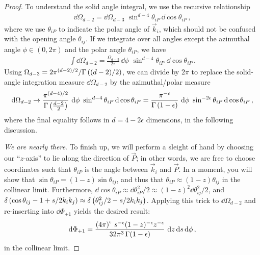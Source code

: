\begin{proof}
    To understand the solid angle integral, we use the recursive relationship
    \begin{align}
        \dd \Omega_{d-2}
        =
        \dd \Omega_{d-3}
        \,\,
        \sin^{d-4}\theta_{iP} \, \dd \cos \theta_{iP}
        \,,
    \end{align}
    where we use \(\theta_{iP}\) to indicate the polar angle of \(\vec{k}_i\), which should not be confused with the opening angle \(\theta_{ij}\).
    If we integrate over all angles except the azimuthal angle \(\phi \in (0, 2\pi)\) and the polar angle \(\theta_{iP}\), we have
    \begin{align}
        \int
        \dd \Omega_{d-2}
        =
        \frac{\Omega_{d-3}}{2\pi}
        \,
        \dd \phi
        \,\,
        \sin^{d-4}\theta_{iP}
        \,\,
        \dd\cos\theta_{iP}
        \,.
    \end{align}
    Using \(\Omega_{d-3} = 2 \pi^{(d-2)/2} / \Gamma\left((d-2)/2\right)\), we can divide by \(2 \pi\) to replace the solid-angle integration measure \(\dd \Omega_{d-2}\) by the azimuthal/polar measure
    \begin{align}
        \dd \Omega_{d-2}
        \to
        \frac{\pi^{(d-4)/2}}{\Gamma\left(\frac{d-2}{2}\right)}
        \,\,
        \dd\phi
        \,\,
        \sin^{d-4}\theta_{iP}
        \,
        \dd \cos\theta_{iP}
        =
        \frac{\pi^{-\epsilon}}{\Gamma\left(1 - \epsilon\right)}
        \,\,
        \dd\phi
        \,\,
        \sin^{-2\epsilon}\theta_{iP}
        \,
        \dd \cos\theta_{iP}
        \,,
    \end{align}
    where the final equality follows in \(d = 4-2\epsilon\) dimensions, in the following discussion.


    \textit{We are nearly there}.
    To finish up, we will perform a sleight of hand by choosing our ``\(z\)-axis'' to lie along the direction of \(\vec{P}\);
    in other words, we are free to choose coordinates such that \(\theta_{iP}\) is the angle between \(\vec{k}_i\) and \(\vec{P}\).
    In a moment, you will show that \(\sin\theta_{iP} = (1-z) \sin\theta_{ij}\), and thus that \(\theta_{iP} \approx (1-z) \theta_{ij}\) in the collinear limit.
    Furthermore, \(\dd \cos\theta_{iP} \approx \dd \theta_{iP}^2 / 2 \approx (1-z)^2 \dd \theta_{ij}^2 / 2\), and \(\delta\left(\cos\theta_{ij} - 1 + s / 2 k_i k_j\right) \approx \delta\left(\theta_{ij}^2/2 - s / 2 k_i k_j\right)\).
    Applying this trick to \(\dd \Omega_{d-2}\) and re-inserting into \(\dd \Phi_{+1}\) yields the desired result:
    \begin{align}
        \dd \Phi_{+1}
        =
        \frac{\left(4 \pi\right)^\epsilon
            \,
            s^{-\epsilon} (1-z)^{-\epsilon} z^{-\epsilon}}
        {32 \pi^3\, \Gamma(1-\epsilon)}
        \,\,
        \dd z \, \dd s \, \dd \phi
        \,,
    \end{align}
    in the collinear limit.
\end{proof}


